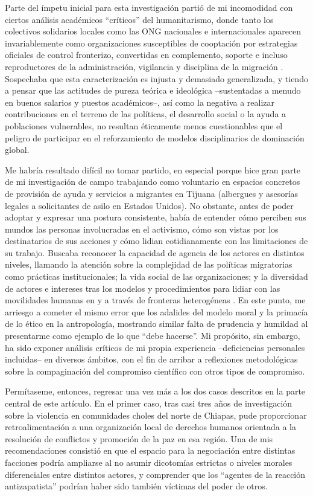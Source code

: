 \documentclass[
  spanish,
  11pt,
  a4paper,
]{scrbook}
\begin{document}
Parte del ímpetu inicial para esta investigación partió de mi
incomodidad con ciertos análisis académicos ``críticos'' del
humanitarismo, donde tanto los colectivos solidarios locales como las
ONG nacionales e internacionales aparecen invariablemente como
organizaciones susceptibles de cooptación por estrategias oficiales de
control fronterizo, convertidas en complemento, soporte e incluso
reproductores de la administración, vigilancia y disciplina de la
migración \autocites[véanse por
ejemplo][]{Bigo2002,Fassin2012,Walters2011}. Sospechaba que esta
caracterización es injusta y demasiado generalizada, y tiendo a pensar
que las actitudes de pureza teórica e ideológica --sustentadas a menudo
en buenos salarios y puestos académicos--, así como la negativa a
realizar contribuciones en el terreno de las políticas, el desarrollo
social o la ayuda a poblaciones vulnerables, no resultan éticamente
menos cuestionables que el peligro de participar en el reforzamiento de
modelos disciplinarios de dominación global.

Me habría resultado difícil no tomar partido, en especial porque hice
gran parte de mi investigación de campo trabajando como voluntario en
espacios concretos de provisión de ayuda y servicios a migrantes en
Tijuana (albergues y asesorías legales a solicitantes de asilo en
Estados Unidos). No obstante, antes de poder adoptar y expresar una
postura consistente, había de entender cómo perciben sus mundos las
personas involucradas en el activismo, cómo son vistas por los
destinatarios de sus acciones y cómo lidian cotidianamente con las
limitaciones de su trabajo. Buscaba reconocer la capacidad de agencia de
los actores en distintos niveles, llamando la atención sobre la
complejidad de las políticas migratorias como prácticas institucionales;
la vida social de las organizaciones; y la diversidad de actores e
intereses tras los modelos y procedimientos para lidiar con las
movilidades humanas en y a través de fronteras heterogéneas
\autocite{AgudoSanchiz2023}. En este punto, me arriesgo a cometer el
mismo error que los adalides del modelo moral y la primacía de lo ético
en la antropología, mostrando similar falta de prudencia y humildad al
presentarme como ejemplo de lo que ``debe hacerse''. Mi propósito, sin
embargo, ha sido exponer análisis críticos de mi propia experiencia
--deficiencias personales incluidas-- en diversos ámbitos, con el fin de
arribar a reflexiones metodológicas sobre la compaginación del
compromiso científico con otros tipos de compromiso.

Permítaseme, entonces, regresar una vez más a los dos casos descritos en
la parte central de este artículo. En el primer caso, tras casi tres
años de investigación sobre la violencia en comunidades choles del norte
de Chiapas, pude proporcionar retroalimentación a una organización local
de derechos humanos orientada a la resolución de conflictos y promoción
de la paz en esa región. Una de mis recomendaciones consistió en que el
espacio para la negociación entre distintas facciones podría ampliarse
al no asumir dicotomías estrictas o niveles morales diferenciales entre
distintos actores, y comprender que los ``agentes de la reacción
antizapatista'' podrían haber sido también víctimas del poder de otros.
\end{document}
